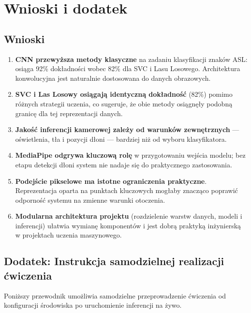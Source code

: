 \chapter{Wnioski i dodatek}
\label{cha:chapter005}

\section{Wnioski}

\begin{enumerate}
    \item \textbf{CNN przewyższa metody klasyczne} na zadaniu klasyfikacji
          znaków ASL: osiąga 92\% dokładności wobec 82\% dla SVC i Lasu
          Losowego. Architektura konwolucyjna jest naturalnie dostosowana
          do danych obrazowych.
    \item \textbf{SVC i Las Losowy osiągają identyczną dokładność} (82\%)
          pomimo różnych strategii uczenia, co sugeruje, że obie metody
          osiągnęły podobną granicę dla tej reprezentacji danych.
    \item \textbf{Jakość inferencji kamerowej zależy od warunków zewnętrznych}
          --- oświetlenia, tła i pozycji dłoni --- bardziej niż od wyboru
          klasyfikatora.
    \item \textbf{MediaPipe odgrywa kluczową rolę} w przygotowaniu wejścia
          modelu; bez etapu detekcji dłoni system nie nadaje się do praktycznego
          zastosowania.
    \item \textbf{Podejście pikselowe ma istotne ograniczenia praktyczne}.
          Reprezentacja oparta na punktach kluczowych mogłaby znacząco
          poprawić odporność systemu na zmienne warunki otoczenia.
    \item \textbf{Modularna architektura projektu} (rozdzielenie warstw danych,
          modeli i inferencji) ułatwia wymianę komponentów i jest dobrą
          praktyką inżynierską w projektach uczenia maszynowego.
\end{enumerate}

\section*{Dodatek: Instrukcja samodzielnej realizacji ćwiczenia}

Poniższy przewodnik umożliwia samodzielne przeprowadzenie ćwiczenia od
konfiguracji środowiska po uruchomienie inferencji na żywo.

